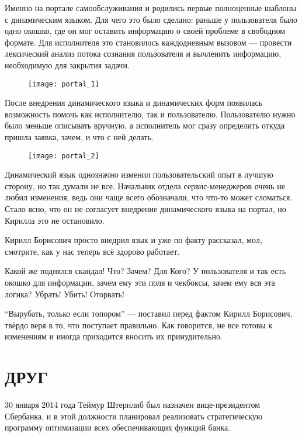 \documentclass[../index.tex]{subfiles}
\begin{document}
Именно на портале самообслуживания и родились первые полноценные шаблоны с динамическим языком. Для чего это было сделано: раньше у пользователя было одно окошко, где он мог оставить информацию о своей проблеме в свободном формате. Для  исполнителя это становилось каждодневным вызовом — провести лексический анализ потока сознания пользователя и вычленить информацию, необходимую для закрытия задачи.

\begin{figure}[H]
	\texttt{[image: portal\_1]}
	\centering
\end{figure}

После внедрения динамического языка и динамических форм появилась возможность помочь как исполнителю, так и пользователю. Пользователю нужно было меньше описывать вручную, а исполнитель мог сразу определить откуда пришла заявка, зачем, и что с ней делать.

\begin{figure}[H]
	\texttt{[image: portal\_2]}
	\centering
\end{figure}

Динамический язык однозначно изменил пользовательский опыт в лучшую сторону, но так думали не все. Начальник отдела сервис-менеджеров очень не любил изменения, ведь они чаще всего обозначали, что что-то может сломаться. Стало ясно, что он не согласует внедрение динамического языка на портал, но Кирилла это не остановило. 

Кирилл Борисович просто внедрил язык и уже по факту рассказал, мол, смотрите, как у нас теперь всё здорово работает. 

Какой же поднялся скандал! Что? Зачем? Для Кого? У пользователя и так есть окошко для информации, зачем ему эти поля и чекбоксы, зачем ему вся эта логика? Убрать! Убить! Оторвать! 

“Вырубать, только если топором” — поставил перед фактом Кирилл Борисович, твёрдо веря в то, что поступает правильно.
Как говорится, не все готовы к изменениям и иногда приходится вносить их принудительно.


\section{ДРУГ}

30 января 2014 года Теймур Штернлиб был назначен вице-президентом Сбербанка, и в этой должности планировал реализовать стратегическую программу оптимизации всех обеспечивающих функций банка. 
\end{document}
